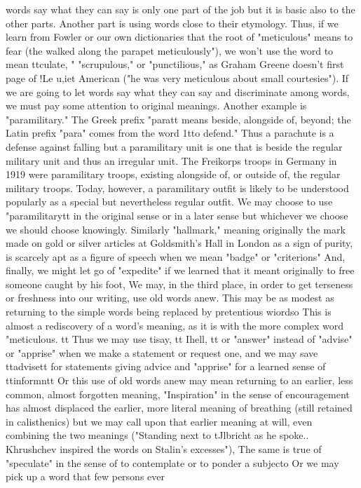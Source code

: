 \documentclass[
    oneside,
    11pt,
    draft
]{memoir}
\begin{document}
words say what they can say is only one part of the job but it is basic also to the other parts. Another part is using words close to their etymology. Thus, if we learn from Fowler or our own dictionaries that the root of "meticulous" means to fear (the walked along the parapet meticulously"), we won't use the word to mean ttculate, " "scrupulous," or "punctilious," as Graham Greene doesn't first page of !Le u,iet American ("he was very meticulous about small courtesies"). If we are going to let words say what they can say and discriminate among words, we must pay some attention to original meanings. Another example is "paramilitary." The Greek prefix "paratt means beside, alongside of, beyond; the Latin prefix "para" comes from the word 1tto defend." Thus a parachute is a defense against falling but a paramilitary unit is one that is beside the regular military unit and thus an irregular unit. The Freikorps troops in Germany in 1919 were paramilitary troops, existing alongside of, or outside of, the regular military troops. Today, however, a paramilitary outfit is likely to be understood popularly as a special but nevertheless regular outfit. We may choose to use "paramilitarytt in the original sense or in a later sense but whichever we choose we should choose knowingly. Similarly "hallmark," meaning originally the mark made on gold or silver articles at Goldsmith's Hall in London as a sign of purity, is scarcely apt as a figure of speech when we mean "badge" or "criterions" And, finally, we might let go of "expedite" if we learned that it meant originally to free someone caught by his foot, We may, in the third place, in order to get terseness or freshness into our writing, use old words anew. This may be as modest as returning to the simple words being replaced by pretentious wiordso This is almost a rediscovery of a word's meaning, as it is with the more complex word "meticulous. tt Thus we may use tisay, tt Ihell, tt or "answer" instead of "advise" or "apprise" when we make a statement or request one, and we may save ttadvisett for statements giving advice and "apprise" for a learned sense of ttinformntt Or this use of old words anew may mean returning to an earlier, less common, almost forgotten meaning, "Inspiration" in the sense of encouragement has almost displaced the earlier, more literal meaning of breathing (still retained in calisthenics) but we may call upon that earlier meaning at will, even combining the two meanings ("Standing next to tJlbricht as he spoke.. Khrushchev inspired the words on Stalin's excesses"), The same is true of "speculate" in the sense of to contemplate or to ponder a subjecto Or we may pick up a word that few persons ever
\end{document}
